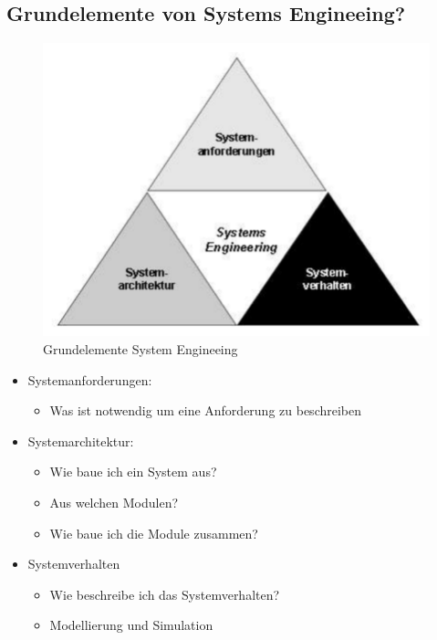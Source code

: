 \subsection{\color{teal} Grundelemente von Systems Engineeing?}

\begin{figure}[H]
	\centering
	\includegraphics[width=0.7\linewidth]{Bilder/Teil1_Grundelemente.png}
	\caption{Grundelemente System Engineeing}
\end{figure}

\begin{itemize}
    \item Systemanforderungen:
    \begin{itemize}
        \item Was ist notwendig um eine Anforderung zu beschreiben
    \end{itemize}
    \item Systemarchitektur:
    \begin{itemize}
        \item Wie baue ich ein System aus?
        \item Aus welchen Modulen?
        \item Wie baue ich die Module zusammen?
    \end{itemize}
    \item Systemverhalten
    \begin{itemize}
        \item Wie beschreibe ich das Systemverhalten?
        \item Modellierung und Simulation
    \end{itemize}
\end{itemize}

